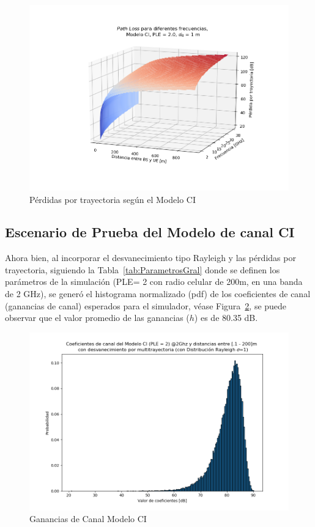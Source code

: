 \begin{figure}[th]
    \centering
    \includegraphics[scale=.6]{Figures/MODELOCI3D_1m.png}
    \decoRule
    \caption[Pérdidas por trayectoria según el Modelo CI]{Pérdidas por trayectoria según el Modelo CI}
    \label{fig:PerdidasCI_C6}
\end{figure}

\subsection{Escenario de Prueba del Modelo de canal CI}

Ahora bien, al incorporar el desvanecimiento tipo Rayleigh y las pérdidas por trayectoria, siguiendo la Tabla~\ref{tab:ParametrosGral} donde se definen los parámetros de la simulación (PLE= 2 con radio celular de 200m, en una banda de 2 GHz), se generó el histograma normalizado (pdf) de los coeficientes de canal (ganancias de canal) esperados para el simulador, véase Figura~\ref{fig:GananciasCI_C6}, se puede observar que el valor promedio de las ganancias ($h$) es de 80.35 dB. \newline

\begin{figure}[th]
    \centering
    \includegraphics[scale=.55]{Figures/CoeficientesCanalCI.png}
    \decoRule
    \caption[Ganancias de Canal Modelo CI]{Ganancias de Canal Modelo CI}
    \label{fig:GananciasCI_C6}
\end{figure}

